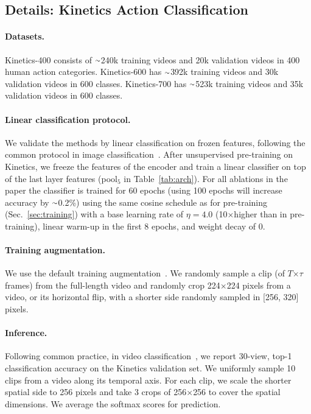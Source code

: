 \documentclass[final]{cvpr}
\newcommand{\tblref}[1]{Table~\ref{#1}}
\newcommand{\sref}[1]{Sec.~\ref{#1}}
\newcommand{\app}{\raise.17ex\hbox{$\scriptstyle\sim$}}
\def\x{$\times$}
\begin{document}
\subsection{Details: Kinetics Action Classification}\label{sec:kinetics}

\paragraph{Datasets.} Kinetics-400 \cite{Kay17} consists of $\app$240k training videos and 20k validation videos in 400 human action categories.
Kinetics-600 \cite{carreira2018short} has $\app$392k training videos and 30k validation videos in 600 classes. 
Kinetics-700 \cite{Carreira19} has $\app$523k training videos and 35k validation videos in 600 classes. 


\paragraph{Linear classification protocol.}
We validate the methods by linear classification on frozen features, following the common protocol in image classification~\cite{He20}.
After unsupervised pre-training on Kinetics, we freeze the features of the encoder and train a linear classifier on top of the last layer features (\eg pool$_5$ in \tblref{tab:arch}). For all ablations in the paper the classifier is trained for 60 epochs (using 100 epochs will increase accuracy by $\app$0.2\%) using the same cosine schedule as for pre-training (\sref{sec:training}) with a base learning rate of  $\eta=4.0$ (10\x higher than in pre-training), linear warm-up in the first 8 epochs, and weight decay of 0.  

\paragraph{Training augmentation.} 	
We use the default training augmentation~\cite{Feichtenhofer19}. We randomly sample a clip (of $T$\x$\tau$ frames) from the full-length video and randomly crop 224\x224 pixels from a video, or its horizontal flip, with a shorter side randomly sampled in [256, 320] pixels.  

\paragraph{Inference.} 	Following common practice, in video classification~\cite{Feichtenhofer19}, we report 30-view, top-1 classification accuracy on the Kinetics validation set. We uniformly sample 10 clips from a video along its temporal axis. For each clip, we scale the shorter spatial side to 256 pixels and take 3 crops of 256\x256 to cover the spatial dimensions. We average the softmax scores for prediction.
\end{document}
